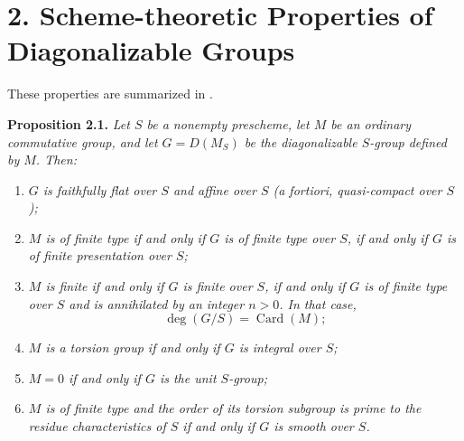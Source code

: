

\section*{2. Scheme-theoretic Properties of Diagonalizable Groups}

These properties are summarized in .

\medskip
\noindent{}\textbf{Proposition 2.1.}
\textit{Let \(S\) be a nonempty prescheme, let \(M\) be an ordinary
commutative group, and let \(G=D(M_S)\) be the diagonalizable \(S\)-group
defined by \(M\). Then:}
\begin{enumerate}
  \item[(a)]
  \textit{\(G\) is faithfully flat over \(S\) and affine over \(S\)
  (a fortiori, quasi-compact over \(S\));}

  \item[(b)]
  \textit{\(M\) is of finite type if and only if \(G\) is of finite type
  over \(S\), if and only if \(G\) is of finite presentation over \(S\);}

  \item[(c)]
  \textit{\(M\) is finite if and only if \(G\) is finite over \(S\), if
  and only if \(G\) is of finite type over \(S\) and is annihilated by an
  integer \(n>0\). In that case,}
  \[
    \deg(G/S)=\operatorname{Card}(M);
  \]

  \item[\((c')\)]
  \textit{\(M\) is a torsion group if and only if \(G\) is integral over
  \(S\);}

  \item[(d)]
  \textit{\(M=0\) if and only if \(G\) is the unit \(S\)-group;}

  \item[(e)]
  \textit{\(M\) is of finite type and the order of its torsion subgroup is
  prime to the residue characteristics of \(S\) if and only if \(G\) is
  smooth over \(S\).}
\end{enumerate}

